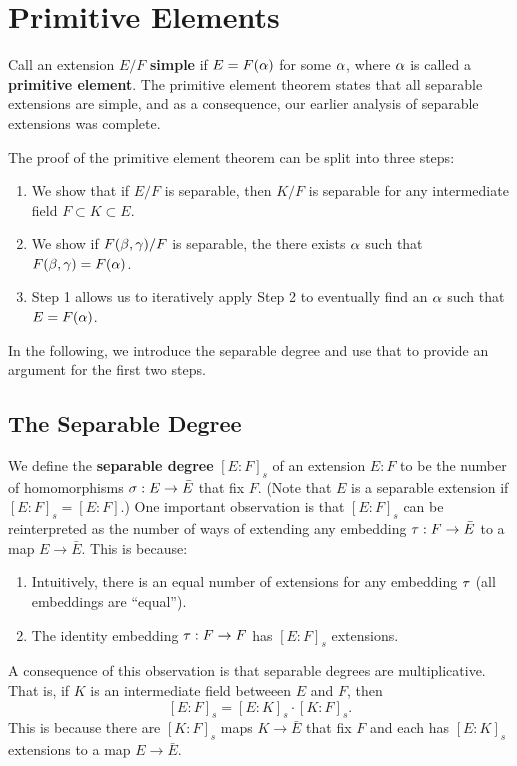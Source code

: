 \section{Primitive Elements}

Call an extension $E/F$ \textbf{simple} if $E = F(\alpha)$ for some $\alpha$, where $\alpha$ is called a \textbf{primitive element}. The primitive element theorem states that all separable extensions are simple, and as a consequence, our earlier analysis of separable extensions was complete.

The proof of the primitive element theorem can be split into three steps:
\begin{enumerate}
    \item We show that if $E/F$ is separable, then $K/F$ is separable for any intermediate field $F \subset K \subset E$.
    \item We show if $F(\beta, \gamma)/F$ is separable, the there exists $\alpha$ such that $F(\beta, \gamma) = F(\alpha)$.
    \item Step 1 allows us to iteratively apply Step 2 to eventually find an $\alpha$ such that $E = F(\alpha)$.
\end{enumerate}

In the following, we introduce the separable degree and use that to provide an argument for the first two steps.

\subsection{The Separable Degree}
We define the \textbf{separable degree} $[E:F]_s$ of an extension $E:F$ to be the number of homomorphisms $\sigma: E \to \bar{E}$ that fix $F$. (Note that $E$ is a separable extension if $[E:F]_s = [E:F]$.) One important observation is that $[E:F]_s$ can be reinterpreted as the number of ways of extending any embedding $\tau: F \to \bar{E}$ to a map $E \to \bar{E}$. This is because:
\begin{enumerate}
    \item Intuitively, there is an equal number of extensions for any embedding $\tau$ (all embeddings are ``equal'').
    \item The identity embedding $\tau: F \to F$ has $[E:F]_s$ extensions.
\end{enumerate}

A consequence of this observation is that separable degrees are multiplicative. That is, if $K$ is an intermediate field betweeen $E$ and $F$, then
\[
    [E:F]_s = [E:K]_s \cdot [K:F]_s.
\]
This is because there are $[K:F]_s$ maps $K \to \bar{E}$ that fix $F$ and each has $[E:K]_s$ extensions to a map $E \to \bar{E}$.

